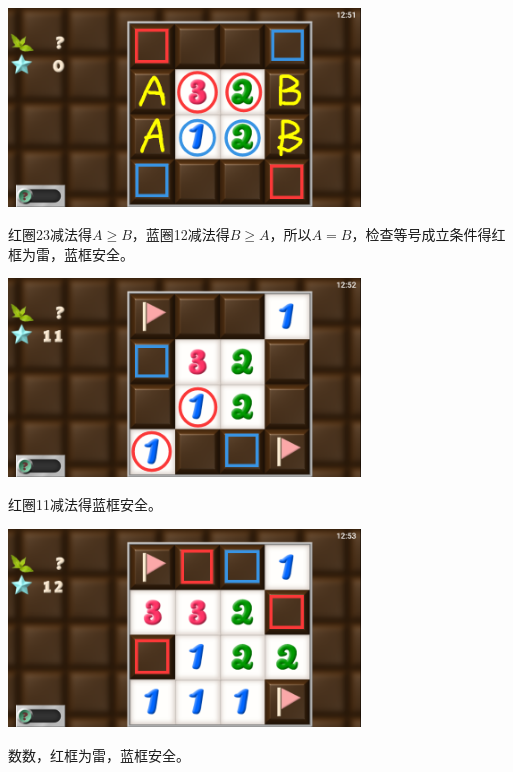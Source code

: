 \subsection{} %
\begin{center}
    \includegraphics[width=0.7\textwidth]{puzzle/137-1.png}
\end{center}
红圈23减法得$A\ge B$，蓝圈12减法得$B\ge A$，所以$A=B$，检查等号成立条件得红框为雷，蓝框安全。
\begin{center}
    \includegraphics[width=0.7\textwidth]{puzzle/137-2.png}
\end{center}
红圈11减法得蓝框安全。
\begin{center}
    \includegraphics[width=0.7\textwidth]{puzzle/137-3.png}
\end{center}
数数，红框为雷，蓝框安全。

